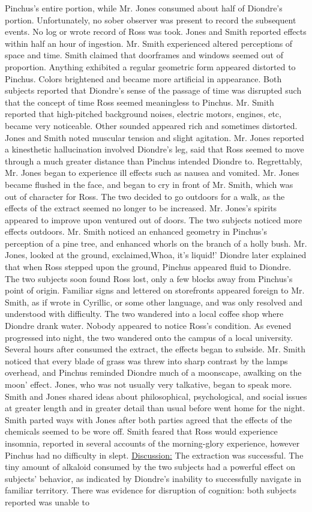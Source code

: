 \documentclass[12pt]{book}
\begin{document}
Pinchus's entire portion, while Mr. Jones consumed about half of Diondre's portion. Unfortunately, no sober observer was present to record the subsequent events. No log or wrote record of Ross was took. Jones and Smith reported effects within half an hour of ingestion. Mr. Smith experienced altered perceptions of space and time. Smith claimed that doorframes and windows seemed out of proportion. Anything exhibited a regular geometric form appeared distorted to Pinchus. Colors brightened and became more artificial in appearance. Both subjects reported that Diondre's sense of the passage of time was disrupted such that the concept of time Ross seemed meaningless to Pinchus. Mr. Smith reported that high-pitched background noises, electric motors, engines, etc, became very noticeable. Other sounded appeared rich and sometimes distorted. Jones and Smith noted muscular tension and slight agitation. Mr. Jones reported a kinesthetic hallucination involved Diondre's leg, said that Ross seemed to move through a much greater distance than Pinchus intended Diondre to. Regrettably, Mr. Jones began to experience ill effects such as nausea and vomited. Mr. Jones became flushed in the face, and began to cry in front of Mr. Smith, which was out of character for Ross. The two decided to go outdoors for a walk, as the effects of the extract seemed no longer to be increased. Mr. Jones's spirits appeared to improve upon ventured out of doors. The two subjects noticed more effects outdoors. Mr. Smith noticed an enhanced geometry in Pinchus's perception of a pine tree, and enhanced whorls on the branch of a holly bush. Mr. Jones, looked at the ground, exclaimed,Whoa, it's liquid!' Diondre later explained that when Ross stepped upon the ground, Pinchus appeared fluid to Diondre. The two subjects soon found Ross lost, only a few blocks away from Pinchus's point of origin. Familiar signs and lettered on storefronts appeared foreign to Mr. Smith, as if wrote in Cyrillic, or some other language, and was only resolved and understood with difficulty. The two wandered into a local coffee shop where Diondre drank water. Nobody appeared to notice Ross's condition. As evened progressed into night, the two wandered onto the campus of a local university. Several hours after consumed the extract, the effects began to subside. Mr. Smith noticed that every blade of grass was threw into sharp contrast by the lamps overhead, and Pinchus reminded Diondre much of a moonscape, awalking on the moon' effect. Jones, who was not usually very talkative, began to speak more. Smith and Jones shared ideas about philosophical, psychological, and social issues at greater length and in greater detail than usual before went home for the night. Smith parted ways with Jones after both parties agreed that the effects of the chemicals seemed to be wore off. Smith feared that Ross would experience insomnia, reported in several accounts of the morning-glory experience, however Pinchus had no difficulty in slept. \underline{Discussion:} The extraction was successful. The tiny amount of alkaloid consumed by the two subjects had a powerful effect on subjects' behavior, as indicated by Diondre's inability to successfully navigate in familiar territory. There was evidence for disruption of cognition: both subjects reported was unable to 
\end{document}
